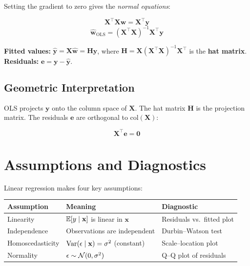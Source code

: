 Setting the gradient to zero gives the \emph{normal equations}:

\[
	\mathbf{X}^\top \mathbf{X} \mathbf{w} = \mathbf{X}^\top \mathbf{y}
\]
\[
	\hat{\mathbf{w}}_{\text{OLS}} = (\mathbf{X}^\top \mathbf{X})^{-1} \mathbf{X}^\top \mathbf{y}
\]

\begin{definition}
	\textbf{Fitted values:} $\hat{\mathbf{y}} = \mathbf{X} \hat{\mathbf{w}} = \mathbf{H} \mathbf{y}$, where $\mathbf{H} = \mathbf{X}(\mathbf{X}^\top \mathbf{X})^{-1} \mathbf{X}^\top$ is the \textbf{hat matrix}.\\
	\textbf{Residuals:} $\mathbf{e} = \mathbf{y} - \hat{\mathbf{y}}$.
\end{definition}

\subsection{Geometric Interpretation}

OLS projects $\mathbf{y}$ onto the column space of $\mathbf{X}$. The hat matrix $\mathbf{H}$ is the projection matrix. The residuals $\mathbf{e}$ are orthogonal to $\text{col}(\mathbf{X})$:

\[
	\mathbf{X}^\top \mathbf{e} = \mathbf{0}
\]

\section{Assumptions and Diagnostics}

Linear regression makes four key assumptions:

\begin{longtable}{p{2.5cm}p{5cm}p{5cm}}
	\toprule
	\textbf{Assumption} & \textbf{Meaning}                                       & \textbf{Diagnostic}        \\
	\midrule
	Linearity           & $\mathbb{E}[y \mid \mathbf{x}]$ is linear in $\mathbf{x}$      & Residuals vs.\ fitted plot \\
	Independence        & Observations are independent                           & Durbin--Watson test        \\
	Homoscedasticity    & $\operatorname{Var}(\epsilon \mid \mathbf{x}) = \sigma^2$ (constant) & Scale--location plot       \\
	Normality           & $\epsilon \sim \mathcal{N}(0, \sigma^2)$                        & Q--Q plot of residuals     \\
	\bottomrule
\end{longtable}

